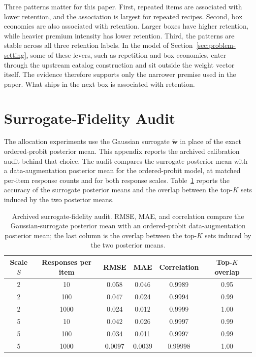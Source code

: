 \documentclass[11pt]{article}
\theoremstyle{definition}
\theoremstyle{remark}
\newcommand{\1}{\mathbf{1}}
\newcommand{\w}{\mathbf{w}}
\begin{document}
Three patterns matter for this paper. First, repeated items are
associated with lower retention, and the association is largest for
repeated recipes. Second, box economics are also associated with retention. Larger boxes have
higher retention, while heavier premium intensity has lower retention. Third, the patterns are stable across all three retention
labels. In the model of Section~\ref{sec:problem-setting}, some of
these levers, such as repetition and box economics, enter through the upstream catalog construction and sit outside the
weight vector itself. The evidence therefore supports only the narrower premise used in the
paper. What ships in the next box is associated with retention.

\section{Surrogate-Fidelity Audit}
\label{app:surrogate-fidelity}

The allocation experiments use the Gaussian surrogate \(\tilde{\w}\) in
place of the exact ordered-probit posterior mean. This appendix reports
the archived calibration audit behind that choice. The audit compares
the surrogate posterior mean with a data-augmentation posterior mean
for the ordered-probit model, at matched per-item response counts and
for both response scales. Table~\ref{tab:surrogate-fidelity} reports
the accuracy of the surrogate posterior means and the overlap between
the top-\(K\) sets induced by the two posterior means.

\begin{table}[h!]
\centering
\scriptsize
\setlength{\tabcolsep}{5pt}
\begin{tabular}{cccccc}
\toprule
Scale \(S\) & Responses per item & RMSE & MAE & Correlation & Top-\(K\) overlap \\
\midrule
2 & 10   & 0.058  & 0.046  & 0.9989  & 0.95 \\
2 & 100  & 0.047  & 0.024  & 0.9994  & 0.99 \\
2 & 1000 & 0.024  & 0.012  & 0.9999  & 1.00 \\
5 & 10   & 0.042  & 0.026  & 0.9997  & 0.99 \\
5 & 100  & 0.034  & 0.011  & 0.9997  & 0.99 \\
5 & 1000 & 0.0097 & 0.0039 & 0.99998 & 1.00 \\
\bottomrule
\end{tabular}
\caption{Archived surrogate-fidelity audit. RMSE, MAE, and correlation
compare the Gaussian-surrogate posterior mean with an ordered-probit
data-augmentation posterior mean; the last column is the overlap
between the top-\(K\) sets induced by the two posterior means.}
\label{tab:surrogate-fidelity}
\end{table}
\end{document}
